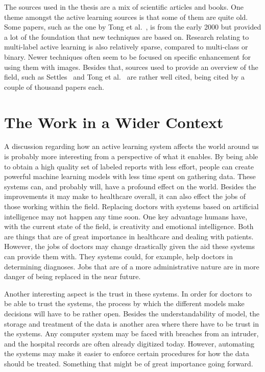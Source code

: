 The sources used in the thesis are a mix of scientific articles and books.
One theme amongst the active learning sources is that some of them are quite old.
Some papers, such as the one by Tong et al.~\cite{tong2001support}, is from the early 2000 but provided a lot of the foundation that new techniques are based on.
Research relating to multi-label active learning is also relatively sparse, compared to multi-class or binary.
Newer techniques often seem to be focused on specific enhancement for using them with images.
Besides that, sources used to provide an overview of the field, such as Settles~\cite{settles2012active} and Tong et al\@.~\cite{tong2001active} are rather well cited, being cited by a couple of thousand papers each.

\section{The Work in a Wider Context}

A discussion regarding how an active learning system affects the world around us is probably more interesting from a perspective of what it enables.
By being able to obtain a high quality set of labeled reports with less effort, people can create powerful machine learning models with less time spent on gathering data.
These systems can, and probably will, have a profound effect on the world.
Besides the improvements it may make to healthcare overall, it can also effect the jobs of those working within the field.
Replacing doctors with systems based on artificial intelligence may not happen any time soon.
One key advantage humans have, with the current state of the field, is creativity and emotional intelligence.
Both are things that are of great importance in healthcare and dealing with patients.
However, the jobs of doctors may change drastically given the aid these systems can provide them with.
They systems could, for example, help doctors in determining diagnoses.
Jobs that are of a more administrative nature are in more danger of being replaced in the near future.

Another interesting aspect is the trust in these systems.
In order for doctors to be able to trust the systems, the process by which the different models make decisions will have to be rather open.
Besides the understandability of model, the storage and treatment of the data is another area where there have to be trust in the systems.
Any computer system may be faced with breaches from an intruder, and the hospital records are often already digitized today.
However, automating the systems may make it easier to enforce certain procedures for how the data should be treated.
Something that might be of great importance going forward.